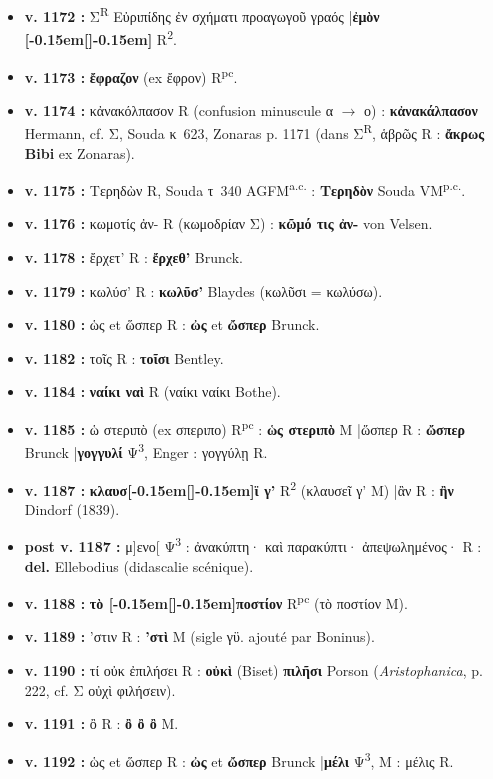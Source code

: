 \documentclass[10pt, a4paper, twoside]{book}
\renewcommand{\_}{\origunderscore\penalty0\relax}
\providecommand{\italique}[1]{\emph{#1}}
\providecommand{\lecon}[1]{\textbf{#1}}
\providecommand{\expo}[1]{\textsuperscript{#1}}
\providecommand{\Rpc}{R\expo{pc}}
\providecommand{\Rdeux}{R\expo{2}}
\providecommand{\Mon}{M}
\providecommand{\PsiTrois}{\textgreek{Ψ}\textsuperscript{3}}
\providecommand{\espApp}{\hspace{0.5em}|\hspace{0.5em}}
\providecommand{\inRas}[2]{[\kern-0.15em[\text{#1}]\kern-0.15em]\text{#2}}
\begin{document}
\begin{itemize}
\begin{itemize}
    \item \textbf{v. 1172 :} Σ\textsuperscript{R} Εὐριπίδης ἐν σχήματι προαγωγοῦ γραός \espApp \textbf{ἐμὸν \inRas{γ'}{}} \Rdeux{}.
    \item \textbf{v. 1173 :} \lecon{ἔφραζον} (ex ἔφρον) \Rpc{}.
    \item \textbf{v. 1174 :} κἀνακόλπασον R (confusion minuscule α $\to$ ο) : \lecon{κἀνακάλπασον} Hermann, cf. Σ, Souda κ~623, Zonaras p. 1171 (dans Σ\textsuperscript{R}, ἁβρῶς R : \lecon{ἄκρως} \lecon{Bibi} ex Zonaras).
    \item \textbf{v. 1175 :} Τερηδὼν R, Souda τ~340 AGF\Mon\expo{a.c.} : \lecon{Τερηδὸν} Souda V\Mon\expo{p.c.}.
    \item \textbf{v. 1176 :} κωμοτίς ἀν- R (κωμοδρίαν Σ) : \lecon{κῶμό τις ἀν-} von Velsen.
    \item \textbf{v. 1178 :} ἔρχετ' R : \lecon{ἔρχεθ'} Brunck.
    \item \textbf{v. 1179 :} κωλύσ' R : \lecon{κωλῦσ'} Blaydes (κωλῦσι = κωλύσω).
    \item \textbf{v. 1180 :} ὡς et ὥσπερ R : \lecon{ὠς} et \lecon{ὤσπερ} Brunck.
    \item \textbf{v. 1182 :} τοῖς R : \lecon{τοῖσι} Bentley.
    \item \textbf{v. 1184 :} \lecon{ναίκι ναὶ} R (ναίκι ναίκι Bothe).
    \item \textbf{v. 1185 :} ὡ στεριπὸ (ex σπεριπο) \Rpc{} : \lecon{ὡς στεριπὸ} \Mon{} \espApp ὥσπερ R : \lecon{ὤσπερ} Brunck \espApp \lecon{γογγυλί} \PsiTrois{}, Enger : γογγύλῃ R.
    \item \textbf{v. 1187 :} \lecon{κλαυσ\inRas{' ε}{}ϊ γ'} \Rdeux{} (κλαυσεῖ γ' \Mon{}) \espApp ἂν R : \lecon{ἢν} Dindorf (1839).
    \item \textbf{post v. 1187 :} μ]ενο[ \PsiTrois{} : ἀνακύπτη· καὶ παρακύπτι· ἀπεψωλημένος· R : \lecon{del.} Ellebodius (didascalie scénique).
    \item \textbf{v. 1188 :} \lecon{τὸ \inRas{σ}{}ποστίον} \Rpc{} (τὸ ποστίον \Mon{}).
    \item \textbf{v. 1189 :} 'στιν R : \lecon{'στὶ} \Mon{} (sigle γϋ. ajouté par Boninus).
    \item \textbf{v. 1190 :} τί οὐκ ἐπιλήσει R : \lecon{οὐκὶ} (Biset) \lecon{πιλῆσι} Porson (\italique{Aristophanica}, p. 222, cf. Σ οὐχὶ φιλήσειν).
    \item \textbf{v. 1191 :} ὂ R : \lecon{ὂ ὂ ὂ} \Mon{}.
    \item \textbf{v. 1192 :} ὡς et ὥσπερ R : \lecon{ὠς} et \lecon{ὤσπερ} Brunck \espApp \lecon{μέλι} \PsiTrois{}, \Mon{} : μέλις R.

\end{itemize}
\end{itemize}
\end{document}
